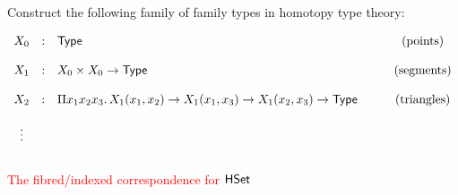 \documentclass[12pt,landscape]{article}
\newcommand{\Type}{\mathsf{Type}}
\begin{document}
\begin{LARGE}
\begin{sf}
\bigskip
\bigskip
Construct the following family of family types in homotopy type theory:

$$
\begin{array}{cllccllll}
X_0 & : & \Type & \mbox{(points)}\\
\\
X_1 & : & X_0 \times X_0 \rightarrow \Type & \mbox{(segments)}\\
\\
X_2 & : & \Pi x_1x_2x_3.\, X_1 (x_1,x_2) \imp X_1 (x_1,x_3) \imp X_1 (x_2,x_3)\rightarrow \Type \qquad & \mbox{(triangles)}\\
\\
\vdots\\
\end{array}
$$
\bigskip

$\!\!\!\!\!\!\!\!\!\!\!\!\!\!\!$

\newpage

\begin{center}
\textcolor{red}{\huge The fibred/indexed correspondence for $\mathsf{HSet}$}
\end{center}


\end{sf}
\end{LARGE}
\end{document}
